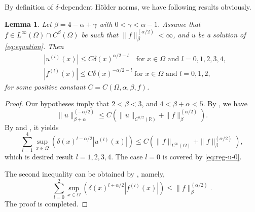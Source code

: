 \documentclass{amsart}
\newtheorem{lemma}[theorem]{Lemma}
\theoremstyle{definition}
\theoremstyle{remark}
\numberwithin{equation}{section}
\begin{document}
By definition of \(\delta\)-dependent H\"older norms, we have following results obviously.
\begin{lemma} \label{lmm:regularity-u}
  Let $\beta=4-\alpha+\gamma$ with \(0 < \gamma <\alpha-1\).
  Assume that $f\in L^\infty(\Omega) \cap C^\beta(\Omega)$ be such that \( \|f\|_{\beta}^{(\alpha/2)} < \infty\),
  and $u$ be a solution of \eqref{eq:equation}. 
  Then 
  \begin{equation*}
  \begin{split}
    &|u^{(l)}(x)| \le C 
    \delta(x)^{\alpha/2-l}  \quad \text{for  } x \in \Omega \text{  and  } l=0, 1, 2, 3, 4,    \\
    &|f^{(l)}(x)| \le C
    \delta(x)^{-\alpha/2-l} \; \text{for  } x \in \Omega \text{  and  } l=0, 1, 2,
  \end{split}
  \end{equation*}
  for some positive constant \(C=C(\Omega, \alpha, \beta, f)\).
\end{lemma}
\begin{proof}
  Our hypotheses imply that \(2<\beta<3\), and \(4<\beta+\alpha<5\).
  By , we have
  \begin{equation*}
    \|u\|_{\beta+\alpha}^{(-\alpha/2)} \le C \left( \|u\|_{C^{\alpha/2}(\mathbb{R})} + \|f\|_{\beta}^{(\alpha/2)}  \right).
  \end{equation*}
  By  and , it yields
  \begin{equation*}
    \sum_{l=1}^{4} \sup_{x\in \Omega} \left( \delta(x)^{l-\alpha/2} \left|u^{(l)}(x)\right| \right) \le C \left( \|f\|_{L^\infty(\Omega)} + \|f\|_{\beta}^{(\alpha/2)}  \right),
  \end{equation*}
  which is desired result \(l=1, 2, 3, 4\). 
  The case \(l = 0\) is covered by \eqref{eq:reg-u-0}.
  
  The second inequality can be obtained by , namely,
  \begin{equation*}
    \sum_{l=0}^{2} \sup_{x\in \Omega} \left( \delta(x)^{l+\alpha/2} |f^{(l)}(x)| \right) \le \|f\|_{\beta}^{(\alpha/2)}.
  \end{equation*}
  The proof is completed.
\end{proof}


 
\end{document}
